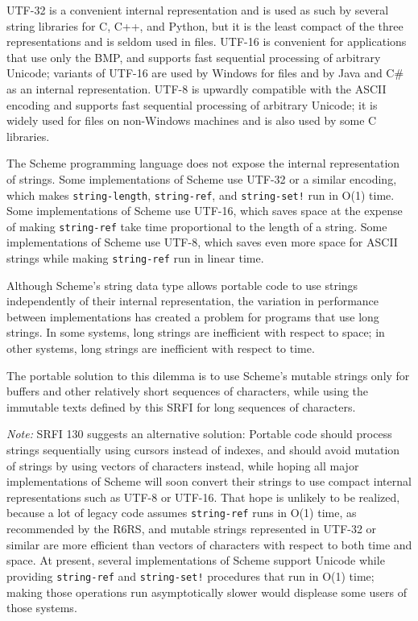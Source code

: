 UTF-32 is a convenient internal representation and is used as such by
several string libraries for C, C++, and Python, but it is the least
compact of the three representations and is seldom used in files. UTF-16
is convenient for applications that use only the BMP, and supports fast
sequential processing of arbitrary Unicode; variants of UTF-16 are used
by Windows for files and by Java and C\# as an internal representation.
UTF-8 is upwardly compatible with the ASCII encoding and supports fast
sequential processing of arbitrary Unicode; it is widely used for files
on non-Windows machines and is also used by some C libraries.

The Scheme programming language does not expose the internal
representation of strings. Some implementations of Scheme use UTF-32 or
a similar encoding, which makes \texttt{string-length},
\texttt{string-ref}, and \texttt{string-set!} run in O(1) time. Some
implementations of Scheme use UTF-16, which saves space at the expense
of making \texttt{string-ref} take time proportional to the length of a
string. Some implementations of Scheme use UTF-8, which saves even more
space for ASCII strings while making \texttt{string-ref} run in linear
time.

Although Scheme's string data type allows portable code to use strings
independently of their internal representation, the variation in
performance between implementations has created a problem for programs
that use long strings. In some systems, long strings are inefficient
with respect to space; in other systems, long strings are inefficient
with respect to time.

The portable solution to this dilemma is to use Scheme's mutable strings
only for buffers and other relatively short sequences of characters,
while using the immutable texts defined by this SRFI for long sequences
of characters.

\emph{Note:} SRFI 130 suggests an alternative solution: Portable code
should process strings sequentially using cursors instead of indexes,
and should avoid mutation of strings by using vectors of characters
instead, while hoping all major implementations of Scheme will soon
convert their strings to use compact internal representations such as
UTF-8 or UTF-16. That hope is unlikely to be realized, because a lot of
legacy code assumes \texttt{string-ref} runs in O(1) time, as
recommended by the R6RS, and mutable strings represented in UTF-32 or
similar are more efficient than vectors of characters with respect to
both time and space. At present, several implementations of Scheme
support Unicode while providing \texttt{string-ref} and
\texttt{string-set!} procedures that run in O(1) time; making those
operations run asymptotically slower would displease some users of those
systems.

